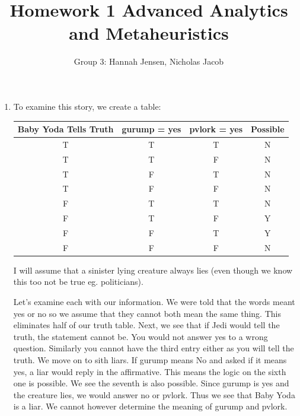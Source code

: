 \documentclass[11pt]{article}
\author{Group 3:  Hannah Jensen, Nicholas Jacob}
\title{Homework 1 Advanced Analytics and Metaheuristics}
\begin{document}
\maketitle
%
\begin{enumerate}
\item To examine this story, we create a table:  
\begin{center}
\begin{tabular}{c|c|c|c}
Baby Yoda Tells Truth&gurump = yes&pvlork = yes& Possible\\ \hline
T&T& T&N\\
T&T&F&N\\
T &F &T&N\\
T&F&F&N\\
F&T&T&N\\
F&T&F&Y\\
F&F&T&Y\\
F&F&F&N

\end{tabular}
\end{center}

I will assume that a sinister lying creature always lies (even though we know this too not be true eg. politicians).  

Let's examine each with our information.  We were told that the words meant yes or no so we assume that they cannot both mean the same thing.  This eliminates half of our truth table.  Next, we see that if Jedi would tell the truth, the statement cannot be.  You would not answer yes to a wrong question.  Similarly you cannot have the third entry either as you will tell the truth.  We move on to sith liars.  If gurump means No and asked if it means yes, a liar would reply in the affirmative.  This means the logic on the sixth one is possible.  We see the seventh is also possible.  Since gurump is yes and the creature lies, we would answer no or pvlork.  Thus we see that Baby Yoda is a liar.  We cannot however determine the meaning of gurump and pvlork.



\end{enumerate}
\end{document}
